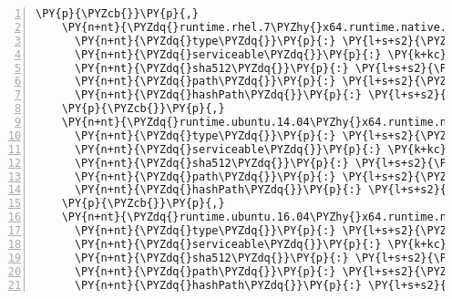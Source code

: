 \begin{Verbatim}[commandchars=\\\{\},numbers=left,firstnumber=1,stepnumber=1,numberblanklines=0]
    \PY{p}{\PYZcb{}}\PY{p}{,}
    \PY{n+nt}{\PYZdq{}runtime.rhel.7\PYZhy{}x64.runtime.native.System.Security.Cryptography.OpenSsl/4.3.0\PYZdq{}}\PY{p}{:} \PY{p}{\PYZob{}}
      \PY{n+nt}{\PYZdq{}type\PYZdq{}}\PY{p}{:} \PY{l+s+s2}{\PYZdq{}package\PYZdq{}}\PY{p}{,}
      \PY{n+nt}{\PYZdq{}serviceable\PYZdq{}}\PY{p}{:} \PY{k+kc}{true}\PY{p}{,}
      \PY{n+nt}{\PYZdq{}sha512\PYZdq{}}\PY{p}{:} \PY{l+s+s2}{\PYZdq{}sha512\PYZhy{}nyFNiCk/r+VOiIqreLix8yN+q3Wga9+SE8BCgkf+2BwEKiNx6DyvFjCgkfV743/grxv8jHJ8gUK4XEQw7yzRYg==\PYZdq{}}\PY{p}{,}
      \PY{n+nt}{\PYZdq{}path\PYZdq{}}\PY{p}{:} \PY{l+s+s2}{\PYZdq{}runtime.rhel.7\PYZhy{}x64.runtime.native.system.security.cryptography.openssl/4.3.0\PYZdq{}}\PY{p}{,}
      \PY{n+nt}{\PYZdq{}hashPath\PYZdq{}}\PY{p}{:} \PY{l+s+s2}{\PYZdq{}runtime.rhel.7\PYZhy{}x64.runtime.native.system.security.cryptography.openssl.4.3.0.nupkg.sha512\PYZdq{}}
    \PY{p}{\PYZcb{}}\PY{p}{,}
    \PY{n+nt}{\PYZdq{}runtime.ubuntu.14.04\PYZhy{}x64.runtime.native.System.Security.Cryptography.OpenSsl/4.3.0\PYZdq{}}\PY{p}{:} \PY{p}{\PYZob{}}
      \PY{n+nt}{\PYZdq{}type\PYZdq{}}\PY{p}{:} \PY{l+s+s2}{\PYZdq{}package\PYZdq{}}\PY{p}{,}
      \PY{n+nt}{\PYZdq{}serviceable\PYZdq{}}\PY{p}{:} \PY{k+kc}{true}\PY{p}{,}
      \PY{n+nt}{\PYZdq{}sha512\PYZdq{}}\PY{p}{:} \PY{l+s+s2}{\PYZdq{}sha512\PYZhy{}ytoewC6wGorL7KoCAvRfsgoJPJbNq+64k2SqW6JcOAebWsFUvCCYgfzQMrnpvPiEl4OrblUlhF2ji+Q1+SVLrQ==\PYZdq{}}\PY{p}{,}
      \PY{n+nt}{\PYZdq{}path\PYZdq{}}\PY{p}{:} \PY{l+s+s2}{\PYZdq{}runtime.ubuntu.14.04\PYZhy{}x64.runtime.native.system.security.cryptography.openssl/4.3.0\PYZdq{}}\PY{p}{,}
      \PY{n+nt}{\PYZdq{}hashPath\PYZdq{}}\PY{p}{:} \PY{l+s+s2}{\PYZdq{}runtime.ubuntu.14.04\PYZhy{}x64.runtime.native.system.security.cryptography.openssl.4.3.0.nupkg.sha512\PYZdq{}}
    \PY{p}{\PYZcb{}}\PY{p}{,}
    \PY{n+nt}{\PYZdq{}runtime.ubuntu.16.04\PYZhy{}x64.runtime.native.System.Security.Cryptography.OpenSsl/4.3.0\PYZdq{}}\PY{p}{:} \PY{p}{\PYZob{}}
      \PY{n+nt}{\PYZdq{}type\PYZdq{}}\PY{p}{:} \PY{l+s+s2}{\PYZdq{}package\PYZdq{}}\PY{p}{,}
      \PY{n+nt}{\PYZdq{}serviceable\PYZdq{}}\PY{p}{:} \PY{k+kc}{true}\PY{p}{,}
      \PY{n+nt}{\PYZdq{}sha512\PYZdq{}}\PY{p}{:} \PY{l+s+s2}{\PYZdq{}sha512\PYZhy{}I8bKw2I8k58Wx7fMKQJn2R8lamboCAiHfHeV/pS65ScKWMMI0+wJkLYlEKvgW1D/XvSl/221clBoR2q9QNNM7A==\PYZdq{}}\PY{p}{,}
      \PY{n+nt}{\PYZdq{}path\PYZdq{}}\PY{p}{:} \PY{l+s+s2}{\PYZdq{}runtime.ubuntu.16.04\PYZhy{}x64.runtime.native.system.security.cryptography.openssl/4.3.0\PYZdq{}}\PY{p}{,}
      \PY{n+nt}{\PYZdq{}hashPath\PYZdq{}}\PY{p}{:} \PY{l+s+s2}{\PYZdq{}runtime.ubuntu.16.04\PYZhy{}x64.runtime.native.system.security.cryptography.openssl.4.3.0.nupkg.sha512\PYZdq{}}

\end{Verbatim}
